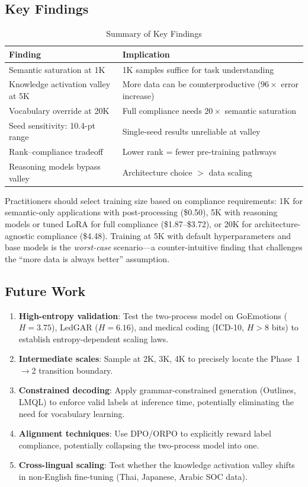 \documentclass[review,3p]{elsarticle}
\begin{document}
\subsection{Key Findings}

\begin{table}[!ht]
\centering
\caption{Summary of Key Findings}
\label{tab:findings}
\begin{tabular}{p{3.2cm}p{4.2cm}}
\toprule
\textbf{Finding} & \textbf{Implication} \\
\midrule
Semantic saturation at 1K & 1K samples suffice for task understanding \\
Knowledge activation valley at 5K & More data can be counterproductive ($96\times$ error increase) \\
Vocabulary override at 20K & Full compliance needs $20\times$ semantic saturation \\
Seed sensitivity: 10.4-pt range & Single-seed results unreliable at valley \\
Rank--compliance tradeoff & Lower rank = fewer pre-training pathways \\
Reasoning models bypass valley & Architecture choice $>$ data scaling \\
\bottomrule
\end{tabular}
\end{table}

Practitioners should select training size based on compliance requirements: 1K for semantic-only applications with post-processing (\$0.50), 5K with reasoning models or tuned LoRA for full compliance (\$1.87--\$3.72), or 20K for architecture-agnostic compliance (\$4.48). Training at 5K with default hyperparameters and base models is the \emph{worst-case} scenario---a counter-intuitive finding that challenges the ``more data is always better'' assumption.

\subsection{Future Work}
\begin{enumerate}
\item \textbf{High-entropy validation}: Test the two-process model on GoEmotions ($H=3.75$), LedGAR ($H=6.16$), and medical coding (ICD-10, $H>8$ bits) to establish entropy-dependent scaling laws.
\item \textbf{Intermediate scales}: Sample at 2K, 3K, 4K to precisely locate the Phase~1$\to$2 transition boundary.
\item \textbf{Constrained decoding}: Apply grammar-constrained generation (Outlines, LMQL) to enforce valid labels at inference time, potentially eliminating the need for vocabulary learning.
\item \textbf{Alignment techniques}: Use DPO/ORPO to explicitly reward label compliance, potentially collapsing the two-process model into one.
\item \textbf{Cross-lingual scaling}: Test whether the knowledge activation valley shifts in non-English fine-tuning (Thai, Japanese, Arabic SOC data).
\end{enumerate}
\end{document}
